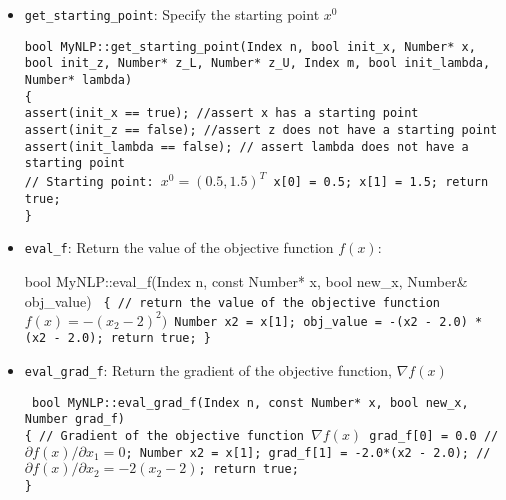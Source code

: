 \documentclass[letter,12pt]{article}
\begin{document}
\begin{itemize}
\begin{small}
{  x\_u[0] = 1.0;  // $x_1 \leq 1$\\
  x\_l[1] = -1.0e19; // $-\infty \leq x_2$\\
  x\_u[1] = +1.0e19; // $x_2 \leq +\infty$\\
  g\_l[0] = g\_u[0] = 0.0; // $g_l=g_u=0$\\
  return true;\\
\}
}
\end{small}
%
\item{{\tt get\_starting\_point}}: 
Specify the starting point $x^0$\\
\begin{small}
{\tt bool MyNLP::get\_starting\_point(Index n, bool init\_x, Number* x,
			       bool init\_z, Number* z\_L, Number* z\_U,
			       Index m, bool init\_lambda,
			       Number* lambda)\\
\{\\
  assert(init\_x == true);  //assert x has a starting point\\
  assert(init\_z == false); //assert z does not have a starting point\\
  assert(init\_lambda == false); // assert lambda does not have a
			       starting point\\
// Starting point: $x^0=(0.5,1.5)^T$
{\subitem}  x[0] = 0.5;
{\subitem}  x[1] = 1.5;
{\subitem}  return true;\\
\}
}
\end{small}
%
\item{{\tt eval\_f}}: 
Return the value of the objective function $f(x)$:\\
\begin{small}
bool MyNLP::eval\_f(Index n, const Number* x, bool new\_x, Number\&
obj\_value)
{\tt
\{
{\subitem}  // return the value of the objective function $f(x)=-(x_2-2)^2)$
{\subitem}  Number x2 = x[1];
{\subitem}  obj\_value = -(x2 - 2.0) * (x2 - 2.0);
{\subitem}  return true;
\}
}
\end{small}
%
\item{{\tt eval\_grad\_f}}: 
Return the gradient of the objective function, $\nabla f(x)$\\
\begin{small}
{\tt 
bool MyNLP::eval\_grad\_f(Index n, const Number* x, bool new\_x, Number\* grad\_f)\\
\{
{\subitem}  // Gradient of the objective function $\nabla f(x)$
{\subitem}  grad\_f[0] = 0.0 // $\partial f(x)/ \partial x_1=0$; 
{\subitem}  Number x2 = x[1];
{\subitem}  grad\_f[1] = -2.0*(x2 - 2.0); //  $\partial f(x)/ \partial x_2=-2(x_2-2)$;
{\subitem}  return true;\\
\}
}
\end{small}



\end{itemize}
\end{document}
